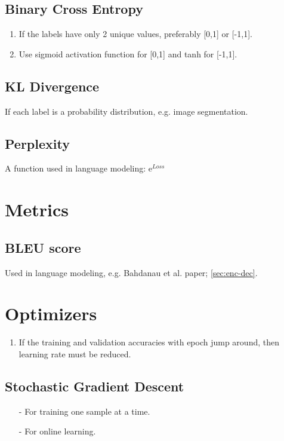 \documentclass[a4paper, 12pt]{report}
\begin{document}
\section{Binary Cross Entropy}
\begin{enumerate}
\item If the labels have only 2 unique values, preferably [0,1] or [-1,1].
\item Use sigmoid activation function for [0,1] and tanh for [-1,1].
\end{enumerate}

\section{KL Divergence}
If each label is a probability distribution, e.g. image segmentation.

\section{Perplexity}
A function used in language modeling: e$^{Loss}$

\chapter{Metrics}

\section{BLEU score}
Used in language modeling, e.g. {\color{green}Bahdanau et al. paper;  \autoref{sec:enc-dec}}.


\chapter{Optimizers}
\begin{enumerate}
\item If the training and validation accuracies with epoch jump around, then learning rate must be reduced.
\end{enumerate}
\section{Stochastic Gradient Descent}
\begin{itemize}
\item[-] For training one sample at a time.

\item[-] For online learning.
\end{itemize}
\end{document}
